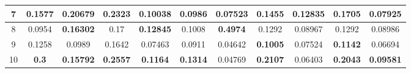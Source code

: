 \begin{table}[htbp]
{\begin{tabular}{@{}ccccccccccc@{}}
    \multicolumn{1}{c|}{7}        & \multicolumn{1}{c|}{0.1577}                                                         & \multicolumn{1}{c||}{\cellcolor[HTML]{FD6864}\textbf{0.20679}}  & \multicolumn{1}{c|}{0.2323}                                  & \multicolumn{1}{c||}{\cellcolor[HTML]{FD6864}\textbf{0.10038}}                                  & \multicolumn{1}{c|}{0.0986}                                  & \multicolumn{1}{c||}{0.07523}                                  & \multicolumn{1}{c|}{0.1455}                                  & \multicolumn{1}{c||}{\cellcolor[HTML]{FD6864}\textbf{0.12835}} & \multicolumn{1}{c|}{0.1705}                                  & \multicolumn{1}{c|}{0.07925}                                  \\ \midrule
    \multicolumn{1}{c|}{8}        & \multicolumn{1}{c|}{0.0954}                                                         & \multicolumn{1}{c||}{\cellcolor[HTML]{FD6864}\textbf{0.16302}}  & \multicolumn{1}{c|}{0.17}                                    & \multicolumn{1}{c||}{\cellcolor[HTML]{FD6864}\textbf{0.12845}} & \multicolumn{1}{c|}{0.1008}                                  & \multicolumn{1}{c||}{\cellcolor[HTML]{FD6864}\textbf{0.4974}}  & \multicolumn{1}{c|}{0.1292}                                  & \multicolumn{1}{c||}{0.08967}                                  & \multicolumn{1}{c|}{0.1292}                                  & \multicolumn{1}{c|}{0.08986}                                  \\ \midrule
    \multicolumn{1}{c|}{9}        & \multicolumn{1}{c|}{0.1258}                                                         & \multicolumn{1}{c||}{0.0989}                                    & \multicolumn{1}{c|}{0.1642}                                  & \multicolumn{1}{c||}{0.07463}                                  & \multicolumn{1}{c|}{0.0911}                                  & \multicolumn{1}{c||}{0.04642}                                  & \multicolumn{1}{c|}{\cellcolor[HTML]{32CB00}\textbf{0.1005}} & \multicolumn{1}{c||}{0.07524}                                  & \multicolumn{1}{c|}{\cellcolor[HTML]{32CB00}\textbf{0.1142}} & \multicolumn{1}{c|}{0.06694}                                  \\ \midrule \midrule
    \multicolumn{1}{c|}{10}       & \multicolumn{1}{c|}{\cellcolor[HTML]{FD6864}\textbf{0.3}}                           & \multicolumn{1}{c||}{\cellcolor[HTML]{FD6864}\textbf{0.15792}}  & \multicolumn{1}{c|}{\cellcolor[HTML]{FD6864}\textbf{0.2557}} & \multicolumn{1}{c||}{\cellcolor[HTML]{FD6864}\textbf{0.1164}}                                   & \multicolumn{1}{c|}{\cellcolor[HTML]{FD6864}\textbf{0.1314}} & \multicolumn{1}{c||}{0.04769}                                  & \multicolumn{1}{c|}{\cellcolor[HTML]{FD6864}\textbf{0.2107}} & \multicolumn{1}{c||}{0.06403}                                  & \multicolumn{1}{c|}{\cellcolor[HTML]{FD6864}\textbf{0.2043}} & \multicolumn{1}{c|}{\cellcolor[HTML]{FD6864}\textbf{0.09581}} \\ \midrule

\end{tabular}}
\end{table}
